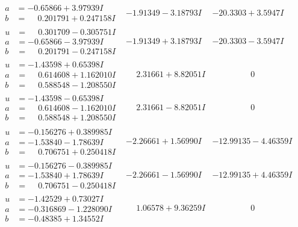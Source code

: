 \documentclass[1p]{elsarticle_modified}
\theoremstyle{definition}
\begin{document}
$$\begin{array}{c|c|c}
\begin{aligned}
a &= -0.65866 + 3.97939 I \\
b &= \phantom{-}0.201791 + 0.247158 I\end{aligned}
 & -1.91349 - 3.18793 I & -20.3303 + 3.5947 I \\ \hline\begin{aligned}
u &= \phantom{-}0.301709 - 0.305751 I \\
a &= -0.65866 - 3.97939 I \\
b &= \phantom{-}0.201791 - 0.247158 I\end{aligned}
 & -1.91349 + 3.18793 I & -20.3303 - 3.5947 I \\ \hline\begin{aligned}
u &= -1.43598 + 0.65398 I \\
a &= \phantom{-}0.614608 + 1.162010 I \\
b &= \phantom{-}0.588548 - 1.208550 I\end{aligned}
 & \phantom{-}2.31661 + 8.82051 I & \phantom{-0.000000 } 0 \\ \hline\begin{aligned}
u &= -1.43598 - 0.65398 I \\
a &= \phantom{-}0.614608 - 1.162010 I \\
b &= \phantom{-}0.588548 + 1.208550 I\end{aligned}
 & \phantom{-}2.31661 - 8.82051 I & \phantom{-0.000000 } 0 \\ \hline\begin{aligned}
u &= -0.156276 + 0.389985 I \\
a &= -1.53840 - 1.78639 I \\
b &= \phantom{-}0.706751 + 0.250418 I\end{aligned}
 & -2.26661 + 1.56990 I & -12.99135 - 4.46359 I \\ \hline\begin{aligned}
u &= -0.156276 - 0.389985 I \\
a &= -1.53840 + 1.78639 I \\
b &= \phantom{-}0.706751 - 0.250418 I\end{aligned}
 & -2.26661 - 1.56990 I & -12.99135 + 4.46359 I \\ \hline\begin{aligned}
u &= -1.42529 + 0.73027 I \\
a &= -0.316869 - 1.228090 I \\
b &= -0.48385 + 1.34552 I\end{aligned}
 & \phantom{-}1.06578 + 9.36259 I & \phantom{-0.000000 } 0 \\ \hline\begin{aligned}

\end{aligned}
\end{array}$$
\end{document}
